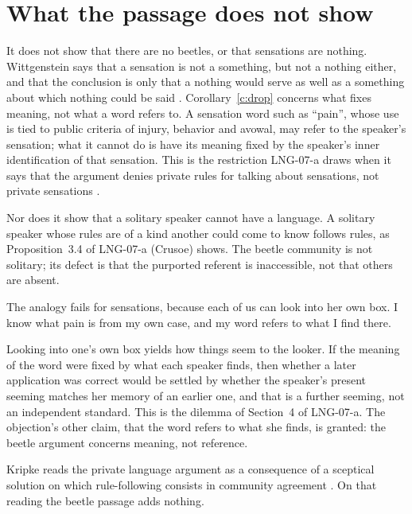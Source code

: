 \documentclass{situationist-preprint}
\begin{document}
\section{What the passage does not show}

It does not show that there are no beetles, or that sensations are nothing. Wittgenstein says that a sensation is not a something, but not a nothing either, and that the conclusion is only that a nothing would serve as well as a something about which nothing could be said \citep[§304]{Wittgenstein1953}. Corollary~\ref{c:drop} concerns what fixes meaning, not what a word refers to. A sensation word such as \enquote{pain}, whose use is tied to public criteria of injury, behavior and avowal, may refer to the speaker's sensation; what it cannot do is have its meaning fixed by the speaker's inner identification of that sensation. This is the restriction LNG-07-a draws when it says that the argument denies private rules for talking about sensations, not private sensations \citep{Kenny1973}.

Nor does it show that a solitary speaker cannot have a language. A solitary speaker whose rules are of a kind another could come to know follows rules, as Proposition~3.4 of LNG-07-a (Crusoe) shows. The beetle community is not solitary; its defect is that the purported referent is inaccessible, not that others are absent.

\begin{objection}
The analogy fails for sensations, because each of us can look into her own box. I know what pain is from my own case, and my word refers to what I find there.
\end{objection}

\begin{reply}
Looking into one's own box yields how things seem to the looker. If the meaning of the word were fixed by what each speaker finds, then whether a later application was correct would be settled by whether the speaker's present seeming matches her memory of an earlier one, and that is a further seeming, not an independent standard. This is the dilemma of Section~4 of LNG-07-a. The objection's other claim, that the word refers to what she finds, is granted: the beetle argument concerns meaning, not reference.
\end{reply}

\begin{objection}
Kripke reads the private language argument as a consequence of a sceptical solution on which rule-following consists in community agreement \citep{Kripke1982}. On that reading the beetle passage adds nothing.
\end{objection}
\end{document}
